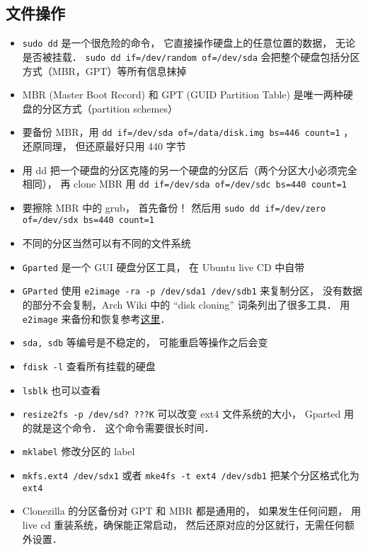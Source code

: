 
\begin{issues}
\issueDraft
\end{issues}

\subsection{文件操作}
\begin{itemize}
\item \verb|sudo dd| 是一个很危险的命令， 它直接操作硬盘上的任意位置的数据， 无论是否被挂载． \verb|sudo dd if=/dev/random of=/dev/sda| 会把整个硬盘包括分区方式（MBR，GPT）等所有信息抹掉
\item MBR (Master Boot Record) 和 GPT (GUID Partition Table) 是唯一两种硬盘的分区方式（partition schemes）
\item 要备份 MBR，用 \verb|dd if=/dev/sda of=/data/disk.img bs=446 count=1| ， 还原同理， 但还原最好只用 440 字节
\item 用 dd 把一个硬盘的分区克隆的另一个硬盘的分区后（两个分区大小必须完全相同）， 再 clone MBR 用 \verb|dd if=/dev/sda of=/dev/sdc bs=440 count=1|
\item 要擦除 MBR 中的 grub， 首先备份！ 然后用 \verb|sudo dd if=/dev/zero of=/dev/sdx bs=440 count=1|
\item 不同的分区当然可以有不同的文件系统
\item \verb|Gparted| 是一个 GUI 硬盘分区工具， 在 Ubuntu live CD 中自带
\item \verb|GParted| 使用 \verb|e2image -ra -p /dev/sda1 /dev/sdb1| 来复制分区， 没有数据的部分不会复制，Arch Wiki 中的 “disk cloning” 词条列出了很多工具． 用 \verb|e2image| 来备份和恢复参考\href{https://stackoverflow.com/questions/51755887/backup-and-restore-e2image-how-do-i-properly-pipe-the-output-from-lzop}{这里}．
\item \verb|sda, sdb| 等编号是不稳定的， 可能重启等操作之后会变
\item \verb|fdisk -l| 查看所有挂载的硬盘
\item \verb|lsblk| 也可以查看
\item \verb|resize2fs -p /dev/sd? ???K| 可以改变 ext4 文件系统的大小， Gparted 用的就是这个命令． 这个命令需要很长时间．
\item \verb|mklabel| 修改分区的 label
\item \verb|mkfs.ext4 /dev/sdx1| 或者 \verb|mke4fs -t ext4 /dev/sdb1| 把某个分区格式化为 \verb|ext4|
\item Clonezilla 的分区备份对 GPT 和 MBR 都是通用的， 如果发生任何问题， 用 live cd 重装系统，确保能正常启动， 然后还原对应的分区就行，无需任何额外设置．

\end{itemize}

